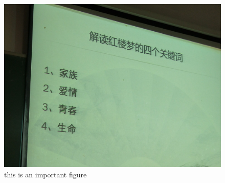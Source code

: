 \documentclass{book}
\begin{document}
\begin{figure}[h]
\centering
\includegraphics[scale=0.1]{English_edition.jpg}
\caption{this is an important figure}
\end{figure}
\end{document}
